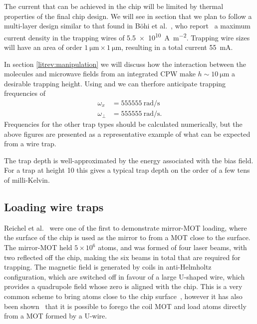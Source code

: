 The current that can be achieved in the chip will be limited by thermal
properties of the final chip design.  We will see in section  that
we plan to follow a multi-layer design similar to that found in B\"ohi et
al.~\cite{Boehi2009}, who report~\cite{rohtula} a maximum current density in the
trapping wires of \SI{5.5e10}{\ampere\per\metre\squared}. Trapping wire sizes
will have an area of order $\SI{1}{\micro\metre} \times \SI{1}{\micro\metre}$,
resulting in a total current \SI{55}{\milli\ampere}.

In section \ref{litrev:manipulation} we will discuss how the interaction between
the molecules and microwave fields from an integrated CPW  make $h \sim \SI{10}{\micro\metre}$ a desirable trapping
height. Using  and 
we can therfore anticipate trapping frequencies of
%
\begin{align}
  \omega_x &= \SI{555555}{\radian \per \second} \\
  \omega_\perp &= \SI{555555}{\radian \per \second}.
\end{align}
%
Frequencies for the other trap types should be calculated numerically, but the above figures are presented as a
representative example of what can be expected from a wire trap.


The trap depth is well-approximated by the energy associated with the bias
field. For a trap at height \SI{10}{\micro}{\metre} this gives a typical trap
depth on the order of a few tens of milli-Kelvin.~\cite{2011Ac}

\subsection{Loading wire traps}

Reichel et al.~\cite{Reichel1999} were one of the first to demonstrate
mirror-MOT loading, where the surface of the chip is used as the mirror to from
a MOT close to the surface. The mirror-MOT held $5\times10^6$  atoms,
and was formed of four laser beams, with two reflected off the chip, making the
six beams in total that are required for trapping. The magnetic field is
generated by coils in anti-Helmholtz configuration, which are switched off in
favour of a large U-shaped wire, which provides a quadrupole field whose zero is
aligned with the chip. This is a very common scheme to bring atoms close to the
chip surface~\cite{Folman2000, PhysRevLett.97.200405, 2011Ac, Boehi2009},
however it has also been shown~\cite{0256-307X-25-9-034} that it is possible to
forego the coil MOT and load atoms directly from a MOT formed by a U-wire.

